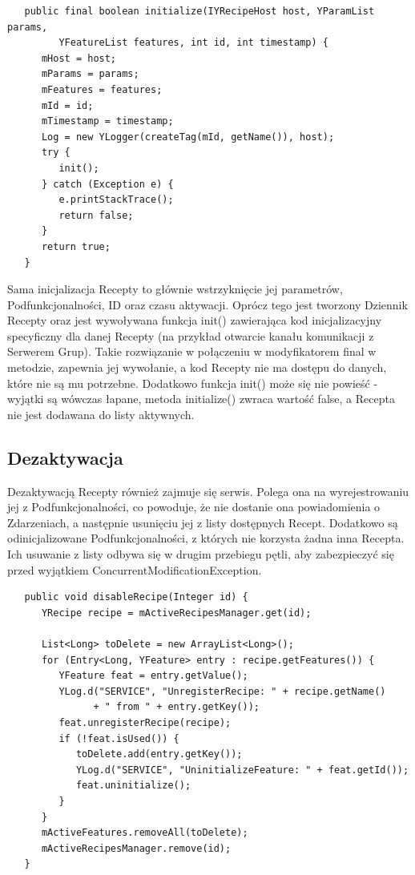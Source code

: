 \documentclass[11pt,a4paper,polish,thesis]{dcsbook}
\begin{document}
\begin{verbatim}
   public final boolean initialize(IYRecipeHost host, YParamList params,
         YFeatureList features, int id, int timestamp) {
      mHost = host;
      mParams = params;
      mFeatures = features;
      mId = id;
      mTimestamp = timestamp;
      Log = new YLogger(createTag(mId, getName()), host);
      try {
         init();
      } catch (Exception e) {
         e.printStackTrace();
         return false;
      }
      return true;
   }
\end{verbatim}

Sama inicjalizacja Recepty to głównie wstrzyknięcie jej parametrów, Podfunkcjonalności, ID oraz czasu aktywacji. Oprócz tego jest tworzony Dziennik Recepty oraz jest wywoływana funkcja init() zawierająca kod inicjalizacyjny specyficzny dla danej Recepty (na przykład otwarcie kanału komunikacji z Serwerem Grup). Takie rozwiązanie w połączeniu w modyfikatorem final w metodzie, zapewnia jej wywołanie, a kod Recepty nie ma dostępu do danych, które nie są mu potrzebne. Dodatkowo funkcja init() może się nie powieść - wyjątki są wówczas łapane, metoda initialize() zwraca wartość false, a Recepta nie jest dodawana do listy aktywnych.
\subsection{Dezaktywacja}
Dezaktywacją Recepty również zajmuje się serwis. Polega ona na wyrejestrowaniu jej z Podfunkcjonalności, co powoduje, że nie dostanie ona powiadomienia o Zdarzeniach, a następnie usunięciu jej z listy dostępnych Recept. Dodatkowo są odinicjalizowane Podfunkcjonalności, z których nie korzysta żadna inna Recepta. Ich usuwanie z listy odbywa się w drugim przebiegu pętli, aby zabezpieczyć się przed wyjątkiem ConcurrentModificationException.
\begin{verbatim}
   public void disableRecipe(Integer id) {
      YRecipe recipe = mActiveRecipesManager.get(id);
      
      List<Long> toDelete = new ArrayList<Long>();
      for (Entry<Long, YFeature> entry : recipe.getFeatures()) {
         YFeature feat = entry.getValue();
         YLog.d("SERVICE", "UnregisterRecipe: " + recipe.getName()
               + " from " + entry.getKey());
         feat.unregisterRecipe(recipe);
         if (!feat.isUsed()) {
            toDelete.add(entry.getKey());
            YLog.d("SERVICE", "UninitializeFeature: " + feat.getId());
            feat.uninitialize();
         }
      }
      mActiveFeatures.removeAll(toDelete);
      mActiveRecipesManager.remove(id);
   }
\end{verbatim}
\end{document}
